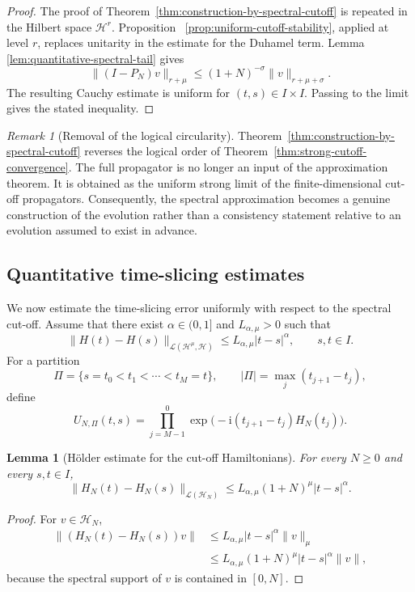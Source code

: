 \documentclass[11pt]{amsart}
\theoremstyle{plain}
\newtheorem{lemma}[theorem]{Lemma}
\theoremstyle{definition}
\theoremstyle{remark}
\newtheorem{remark}[theorem]{Remark}
\newcommand{\Hilb}{\mathcal H}
\newcommand{\ii}{\mathrm i}
\begin{document}
\begin{proof}
The proof of Theorem~\ref{thm:construction-by-spectral-cutoff} is
repeated in the Hilbert space \(\Hilb^r\).  Proposition~
\ref{prop:uniform-cutoff-stability}, applied at level \(r\), replaces
unitarity in the estimate for the Duhamel term.  Lemma~
\ref{lem:quantitative-spectral-tail} gives
\[
\|(I-P_N)v\|_{r+\mu}
\leq
(1+N)^{-\sigma}\|v\|_{r+\mu+\sigma}.
\]
The resulting Cauchy estimate is uniform for \((t,s)\in I\times I\).
Passing to the limit gives the stated inequality.
\end{proof}
\begin{remark}[Removal of the logical circularity]
\label{rem:removal-circularity}
Theorem~\ref{thm:construction-by-spectral-cutoff} reverses the logical order
of Theorem~\ref{thm:strong-cutoff-convergence}. The full propagator is no longer an
input of the approximation theorem. It is obtained as the uniform strong
limit of the finite-dimensional cut-off propagators. Consequently, the
spectral approximation becomes a genuine construction of the evolution
rather than a consistency statement relative to an evolution assumed to
exist in advance.
\end{remark}

\subsection{Quantitative time-slicing estimates}
\label{subsec:quantitative-time-slicing}

We now estimate the time-slicing error uniformly with respect to the spectral
cut-off. Assume that there exist \(\alpha\in(0,1]\) and
\(L_{\alpha,\mu}>0\) such that
\[
 \|H(t)-H(s)\|_{\mathcal L(\Hilb^\mu,\Hilb)}
 \leq L_{\alpha,\mu}|t-s|^\alpha,
 \qquad s,t\in I.
\]
For a partition
\[
 \Pi=\{s=t_0<t_1<\cdots<t_M=t\},
 \qquad
 |\Pi|=\max_j(t_{j+1}-t_j),
\]
define
\[
 U_{N,\Pi}(t,s)
 =
 \prod_{j=M-1}^{0}
 \exp\bigl(-\ii(t_{j+1}-t_j)H_N(t_j)\bigr).
\]

\begin{lemma}[Hölder estimate for the cut-off Hamiltonians]
\label{lem:cutoff-holder-estimate}
For every \(N\geq0\) and every \(s,t\in I\),
\[
 \|H_N(t)-H_N(s)\|_{\mathcal L(\Hilb_N)}
 \leq
 L_{\alpha,\mu}(1+N)^\mu|t-s|^\alpha.
\]
\end{lemma}

\begin{proof}
For \(v\in\Hilb_N\),
\[
\begin{aligned}
 \|(H_N(t)-H_N(s))v\|
 &\leq L_{\alpha,\mu}|t-s|^\alpha\|v\|_\mu \\
 &\leq L_{\alpha,\mu}(1+N)^\mu
 |t-s|^\alpha\|v\|,
\end{aligned}
\]
because the spectral support of \(v\) is contained in \([0,N]\).
\end{proof}
\end{document}
